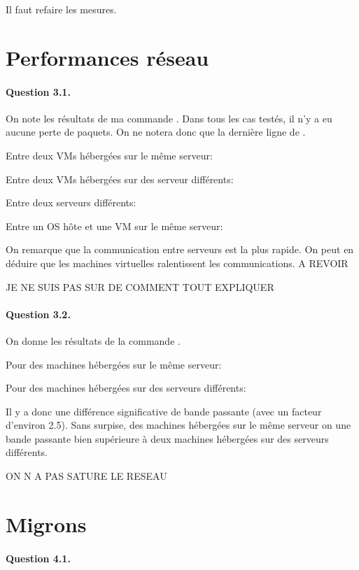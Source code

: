 \documentclass[12pt]{article}
\begin{document}
Il faut refaire les mesures.

\section{Performances réseau}
\paragraph{Question 3.1.}
On note les résultats de ma commande . Dans tous les cas testés, il n'y a eu aucune perte de paquets. On ne notera donc que la dernière ligne de .

Entre deux VMs hébergées sur le même serveur:


Entre deux VMs hébergées sur des serveur différents:


Entre deux serveurs différents:


Entre un OS hôte et une VM sur le même serveur:



On remarque que la communication entre serveurs est la plus rapide. On peut en déduire que les machines virtuelles ralentissent les communications. A REVOIR

JE NE SUIS PAS SUR DE COMMENT TOUT EXPLIQUER

\paragraph{Question 3.2.}
On donne les résultats de la commande .

Pour des machines hébergées sur le même serveur:


Pour des machines hébergées sur des serveurs différents:


Il y a donc une différence significative de bande passante (avec un facteur d'environ 2.5). Sans surpise, des machines hébergées sur le même serveur on une bande passante bien supérieure à deux machines hébergées sur des serveurs différents.

ON N A PAS SATURE LE RESEAU

\section{Migrons}
\paragraph{Question 4.1.}
\end{document}
